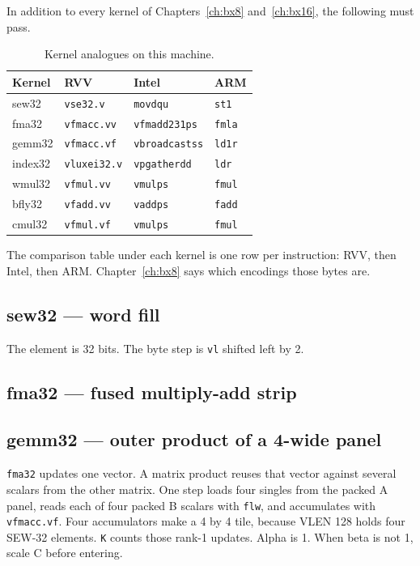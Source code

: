 In addition to every kernel of Chapters~\ref{ch:bx8} and~\ref{ch:bx16}, the following must pass.

\begin{table}[htbp]
\centering
\caption{Kernel analogues on this machine.}
\small
\begin{tabular}{@{}llll@{}}
\toprule
Kernel & RVV & Intel & ARM \\
\midrule
sew32 & \texttt{vse32.v} & \texttt{movdqu} & \texttt{st1} \\
fma32 & \texttt{vfmacc.vv} & \texttt{vfmadd231ps} & \texttt{fmla} \\
gemm32 & \texttt{vfmacc.vf} & \texttt{vbroadcastss} & \texttt{ld1r} \\
index32 & \texttt{vluxei32.v} & \texttt{vpgatherdd} & \texttt{ldr} \\
wmul32 & \texttt{vfmul.vv} & \texttt{vmulps} & \texttt{fmul} \\
bfly32 & \texttt{vfadd.vv} & \texttt{vaddps} & \texttt{fadd} \\
cmul32 & \texttt{vfmul.vf} & \texttt{vmulps} & \texttt{fmul} \\
\bottomrule
\end{tabular}
\end{table}

The comparison table under each kernel is one row per instruction: RVV, then Intel, then ARM. Chapter~\ref{ch:bx8} says which encodings those bytes are.

\subsection{sew32 --- word fill}
The element is 32 bits. The byte step is \texttt{vl} shifted left by 2.



\subsection{fma32 --- fused multiply-add strip}


\subsection{gemm32 --- outer product of a 4-wide panel}
\label{sec:gemm32}

\texttt{fma32} updates one vector. A matrix product reuses that vector against several scalars from the other matrix. One step loads four singles from the packed A panel, reads each of four packed B scalars with \texttt{flw}, and accumulates with \texttt{vfmacc.vf}. Four accumulators make a 4 by 4 tile, because VLEN 128 holds four SEW-32 elements. \texttt{K} counts those rank-1 updates. Alpha is 1. When beta is not 1, scale C before entering.


